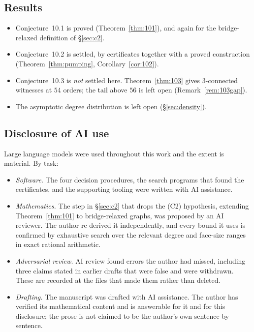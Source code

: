 \documentclass[11pt,a4paper]{amsart}
\theoremstyle{plain}
\theoremstyle{definition}
\begin{document}
\subsection*{Results}

\begin{itemize}
  \item Conjecture~10.1 is proved (Theorem~\ref{thm:101}), and again for the
        bridge-relaxed definition of \S\ref{sec:c2}.
  \item Conjecture~10.2 is settled, by certificates together with a proved
        construction (Theorem~\ref{thm:pumping}, Corollary~\ref{cor:102}).
  \item Conjecture~10.3 is \emph{not} settled here. Theorem~\ref{thm:103}
        gives $3$-connected witnesses at $54$ orders; the tail above $56$ is
        left open (Remark~\ref{rem:103gap}).
  \item The asymptotic degree distribution is left open (\S\ref{sec:density}).
\end{itemize}

\subsection*{Disclosure of AI use}

Large language models were used throughout this work and the extent is
material. By task:

\begin{itemize}
\item \emph{Software.} The four decision procedures, the search programs that
  found the certificates, and the supporting tooling were written with AI
  assistance.
\item \emph{Mathematics.} The step in \S\ref{sec:c2} that drops the (C2)
  hypothesis, extending Theorem~\ref{thm:101} to bridge-relaxed graphs, was
  proposed by an AI reviewer. The author re-derived it independently, and every bound it
  uses is confirmed by exhaustive search over the relevant degree and face-size
  ranges in exact rational arithmetic.
\item \emph{Adversarial review.} AI review found errors the author had missed,
  including three claims stated in earlier drafts that were false and were
  withdrawn. These are recorded at the files that made them rather than deleted.
\item \emph{Drafting.} The manuscript was drafted with AI assistance. The author
  has verified its mathematical content and is answerable for it and for this
  disclosure; the prose is not claimed to be the author's own sentence by
  sentence.
\end{itemize}
\end{document}
